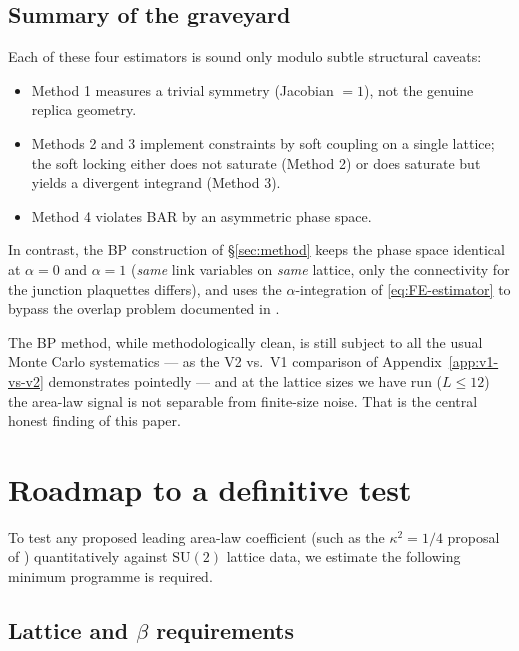 \documentclass[11pt,a4paper]{article}
\theoremstyle{definition}
\newcommand{\SUtwo}{\mathrm{SU}(2)}
\begin{document}
\subsection{Summary of the graveyard}

Each of these four estimators is sound only modulo subtle structural
caveats:
\begin{itemize}
   \item Method 1 measures a trivial symmetry (Jacobian $=1$), not
         the genuine replica geometry.
   \item Methods 2 and 3 implement constraints by soft coupling on a
         single lattice; the soft locking either does not saturate
         (Method 2) or does saturate but yields a divergent
         integrand (Method 3).
   \item Method 4 violates BAR by an asymmetric phase space.
\end{itemize}
In contrast, the BP construction of \S\ref{sec:method} keeps the
phase space identical at $\alpha = 0$ and $\alpha = 1$
(\emph{same} link variables on \emph{same} lattice, only the
connectivity for the junction plaquettes differs), and uses the
$\alpha$-integration of \eqref{eq:FE-estimator} to bypass the overlap
problem documented in \cite[\S 3]{Rindlisbacher2022}.

The BP method, while methodologically clean, is still subject to all
the usual Monte Carlo systematics --- as the V2 vs.\ V1 comparison
of Appendix~\ref{app:v1-vs-v2} demonstrates pointedly --- and at the
lattice sizes we have run ($L \le 12$) the area-law signal is not
separable from finite-size noise. That is the central honest
finding of this paper.

\section{Roadmap to a definitive test}
\label{sec:roadmap}

To test any proposed leading area-law coefficient (such as the
$\kappa^{2} = 1/4$ proposal of \cite{KR2026}) quantitatively against
$\SUtwo$ lattice data, we estimate the following minimum programme is
required.

\subsection{Lattice and $\beta$ requirements}
\end{document}
